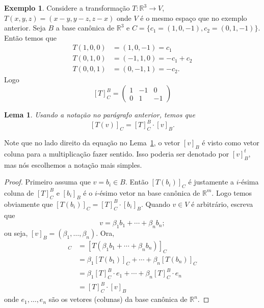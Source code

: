 \documentclass[12pt]{amsart}
\newcommand{\R}{\mathbb R}
\newtheorem{lemma}[theorem]{Lema}
\theoremstyle{definition}
\newtheorem{example}[theorem]{Exemplo}
\begin{document}
\begin{example}
Considere a transformação $T:\R^3\to V$, $T(x,y,z)=(x-y,y-z,z-x)$ onde $V$ é o mesmo espaço que no exemplo anterior. Seja $B$ a base canônica de $\R^3$ e $C=\{c_1=(1,0,-1),c_2=(0,1,-1)\}$. Então temos que 
\begin{align*}
    T(1,0,0)&=(1,0,-1)=c_1\\
    T(0,1,0)&=(-1,1,0)=-c_1+c_2\\
    T(0,0,1)&=(0,-1,1)=-c_2.
\end{align*}
Logo
\[
    [T]^B_C=\begin{pmatrix} 1 & -1 & 0 \\ 0 & 1 & -1\end{pmatrix}
\]
\end{example}
\begin{lemma}\label{lem:matr}
    Usando a notação no parágrafo anterior, temos que 
    \[
        [T(v)]_C=[T]^B_C\cdot [v]_B.
    \]
\end{lemma}

Note que no lado direito da equação no Lema~\ref{lem:matr}, o vetor $[v]_B$ é visto como vetor coluna 
para a multiplicação fazer sentido. Isso poderia ser denotado por $[v]_B^t$, mas nós escolhemos a 
notação mais simples. 

\begin{proof}
    Primeiro assuma que $v=b_i\in B$. Então $[T(b_i)]_C$ é justamente a $i$-ésima coluna de $[T]^B_C$ 
    e $[b_i]_B$ é o $i$-ésimo vetor na base canônica de $\R^m$. 
    Logo temos obviamente que $[T(b_i)]_C=[T]^B_C\cdot [b_i]_B$. Quando $v\in V$ é arbitrário, escreva que 
    \[
        v=\beta_1b_1+\cdots+\beta_n b_n;
    \]
    ou seja, $[v]_B=(\beta_1,\ldots,\beta_n)$. Ora,
    \begin{align*}
        [T(v)]_C&=[T(\beta_1b_1+\cdots+\beta_n b_n)]_C\\&=
        \beta_1 [T(b_1)]_C+\cdots +\beta_n [T(b_n)]_C\\&=
        \beta_1 [T]^B_C\cdot e_1+\cdots +\beta_n[T]^B_C\cdot e_n\\&=
        [T]^B_C \cdot [v]_B
    \end{align*}
    onde $e_1,\ldots,e_n$ são os vetores (colunas) da base canônica de $\R^n$.
\end{proof}
\end{document}
